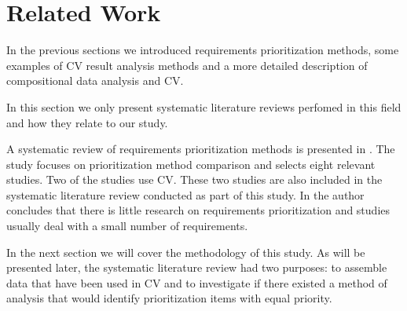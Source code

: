 \section{Related Work\label{relatedwork}}
In the previous sections we introduced requirements prioritization methods, some examples of CV result analysis methods and a more detailed description of compositional data analysis and CV.

In this section we only present systematic literature reviews perfomed in this field and how they relate to our study.

A systematic review of requirements prioritization methods is presented in \cite{Khan2006}. The study focuses on prioritization method comparison and selects eight relevant studies. Two of the studies use CV. These two studies are also included in the systematic literature review conducted as part of this study. In \cite{Khan2006} the author concludes that there is little research on requirements prioritization and studies usually deal with a small number of requirements.

In the next section we will cover the methodology of this study. As will be presented later, the systematic literature review had two purposes: to assemble data that have been used in CV and to investigate if there existed a method of analysis that would identify prioritization items with equal priority.